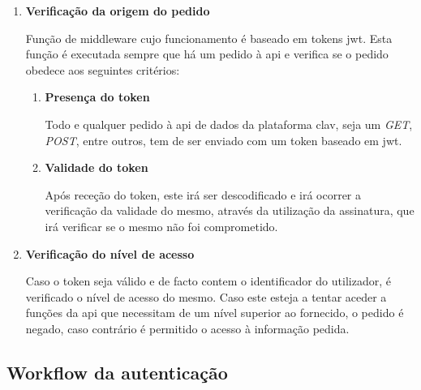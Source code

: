 \begin{enumerate}
    \item \textbf{Verificação da origem do pedido}
    
    Função de middleware cujo funcionamento é baseado em tokens \gls{jwt}. Esta função é executada sempre que há um pedido à \gls{api} e verifica se o pedido obedece aos seguintes critérios:

    \begin{enumerate}
        \item \textbf{Presença do token}
        
        Todo e qualquer pedido à \gls{api} de dados da plataforma \gls{clav}, seja um \emph{GET}, \emph{POST}, entre outros, tem de ser enviado com um token baseado em \gls{jwt}.
        
        \item \textbf{Validade do token}
        
        Após receção do token, este irá ser descodificado e irá ocorrer a verificação da validade do mesmo, através da utilização da assinatura, que irá verificar se o mesmo não foi comprometido.
    \end{enumerate}
    
    \item \textbf{Verificação do nível de acesso}
    
    Caso o token seja válido e de facto contem o identificador do utilizador, é verificado o nível de acesso do mesmo. Caso este esteja a tentar aceder a funções da \gls{api} que necessitam de um nível superior ao fornecido, o pedido é negado, caso contrário é permitido o acesso à informação pedida. 
\end{enumerate}

\cleardoublepage
\subsection{Workflow da autenticação}

